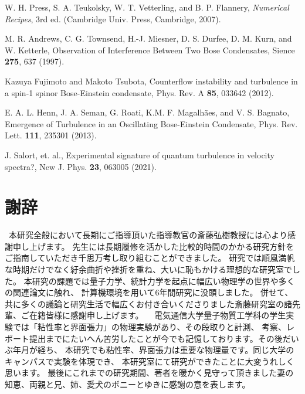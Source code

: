 \documentclass[12pt,a4paper]{jbook}
\begin{document}
\begin{thebibliography}{99}
        W. H. Press, S. A. Teukolsky, W. T. Vetterling, and B. P. Flannery,
        {\it Numerical Recipes},
        3rd ed. (Cambridge Univ. Press, Cambridge, 2007).
    
        M. R. Andrews, C. G. Townsend, H.-J. Miesner, D. S. Durfee, D. M. Kurn, and
        W. Ketterle,
        Observation of Interference Between Two Bose Condensates,
        Sience \textbf{275}, 637 (1997).
    
        Kazuya Fujimoto and Makoto Tsubota,
        Counterflow instability and turbulence in a spin-1 spinor Bose-Einstein condensate,
        Phys. Rev. A \textbf{85}, 033642 (2012).
    
        E. A. L. Henn, J. A. Seman, G. Roati, K.M. F. Magalh\~aes, and V. S. Bagnato,
        Emergence of Turbulence in an Oscillating Bose-Einstein Condensate,
        Phys. Rev. Lett. \textbf{111}, 235301 (2013).

        J. Salort, et. al.,
        Experimental signature of quantum turbulence in velocity spectra?,
        New J. Phys. \textbf{23}, 063005 (2021).
        
    \end{thebibliography}
    
    \newpage
    \chapter*{謝辞}
	\
	本研究全般において長期にご指導頂いた指導教官の斎藤弘樹教授には心より感謝申し上げます。
	先生には長期履修を活かした比較的時間のかかる研究方針をご指南していただき千思万考し取り組むことができました。
	研究では順風満帆な時期だけでなく紆余曲折や挫折を重ね、大いに恥もかける理想的な研究室でした。
	本研究の課題では量子力学、統計力学を起点に幅広い物理学の世界や多くの関連論文に触れ、
	計算機環境を用いて6年間研究に没頭しました。
	併せて、共に多くの議論と研究生活で幅広くお付き合いくださりました斎藤研究室の諸先輩、ご在籍皆様に感謝申し上げます。
  　電気通信大学量子物質工学科の学生実験では「粘性率と界面張力」の物理実験があり、その段取りと計測、
    考察、レポート提出までにたいへん苦労したことが今でも記憶しております。その後だいぶ年月が経ち、
    本研究でも粘性率、界面張力は重要な物理量です。同じ大学のキャンパスで実験を体現でき、
    本研究室にて研究ができたことに大変うれしく思います。
	最後にこれまでの研究期間、著者を暖かく見守って頂きました妻の知恵、両親と兄、姉、愛犬のボニーとゆきに感謝の意を表します。
\end{document}
